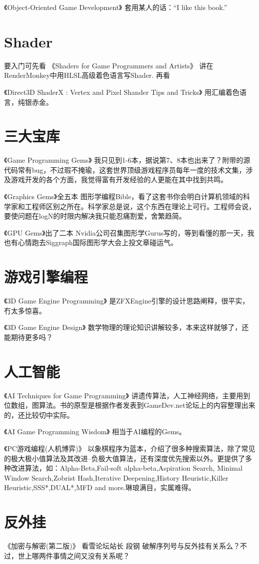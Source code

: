 \documentclass[UTF8,a4paper,8pt]{ctexart}
\begin{document}
《Object-Oriented Game Development》
套用某人的话：“I like this book.”
\section{Shader}
要入门可先看
《Shaders for Game Programmers and Artists》
讲在RenderMonkey中用HLSL高级着色语言写Shader.
再看

《Direct3D ShaderX : Vertex and Pixel Shander Tips and Tricks》
用汇编着色语言，纯银赤金。
\section{三大宝库}
《Game Programming Gems》
我只见到1-6本，据说第7、8本也出来了？附带的源代码常有bug，不过瑕不掩瑜，这套世界顶级游戏程序员每年一度的技术文集，涉及游戏开发的各个方面，我觉得富有开发经验的人更能在其中找到共鸣。

《Graphics Gems》全五本
图形学编程Bible，看了这套书你会明白计算机领域的科学家和工程师区别之所在。科学家总是说，这个东西在理论上可行。工程师会说，要使问题在logN的时限内解决我只能忍痛割爱，舍繁趋简。

《GPU Gems》出了二本
Nvidia公司召集图形学Gurus写的，等到看懂的那一天，我也有心情跑去Siggraph国际图形学大会上投文章碰运气。
\section{游戏引擎编程}
《3D Game Engine Programming》
是ZFXEngine引擎的设计思路阐释，很平实，冇太多惊喜。

《3D Game Engine Design》
数学物理的理论知识讲解较多，本来这样就够了，还能期待更多吗？
\section{人工智能}
《AI Techniques for Game Programming》
讲遗传算法，人工神经网络，主要用到位数组，图算法。书的原型是根据作者发表到GameDev.net论坛上的内容整理出来的，还比较切中实际。

《AI Game Programming Wisdom》
相当于AI编程的Gems。

《PC游戏编程(人机博弈)》
以象棋程序为蓝本，介绍了很多种搜索算法，除了常见的极大极小值算法及其改进--负极大值算法，还有深度优先搜索以外。更提供了多种改进算法，如：Alpha-Beta,Fail-soft alpha-beta,Aspiration Search, Minimal Window Search,Zobrist Hash,Iterative Deepening,History Heuristic,Killer Heuristic,SSS*,DUAL*,MFD and more.琳琅满目，实属难得。
\section{反外挂}
《加密与解密(第二版)》 看雪论坛站长 段钢
破解序列号与反外挂有关系么？不过，世上哪两件事情之间又没有关系呢？
\end{document}
